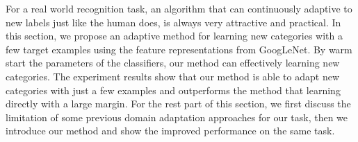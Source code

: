 ﻿For a real world recognition task, an algorithm that can continuously adaptive to new labels just like the human does, is always very attractive and practical.
In this section, we propose an adaptive method for learning new categories with a few target examples using the feature representations from GoogLeNet. By warm start the parameters of the classifiers, our method can effectively learning new categories. The experiment results show that our method is able to adapt new categories with just a few examples and outperforms the method that learning directly with a large margin.
For the rest part of this section, we first discuss the limitation of some previous domain adaptation approaches for our task, then we introduce our method and show the improved performance on the same task.

%
